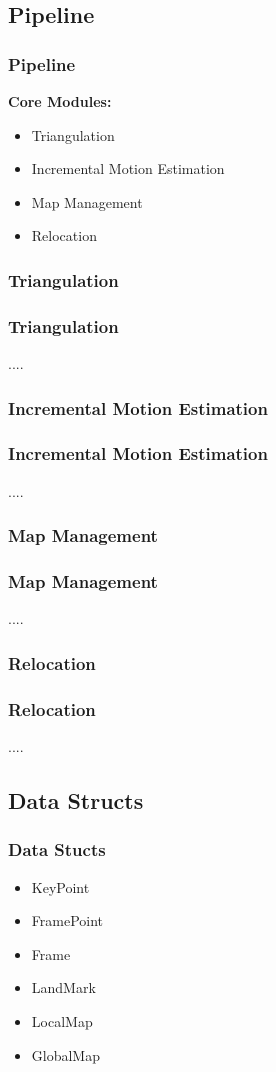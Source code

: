 \documentclass[16pt]{beamer}
\begin{document}
\subsection{Pipeline}
\begin{frame}
  \frametitle{Pipeline}
  \textbf{ Core Modules: } \\
  \begin{itemize}
  \item Triangulation
  \item Incremental Motion Estimation
  \item Map Management 
  \item Relocation
  \end{itemize}

\end{frame}

\subsubsection*{Triangulation}
\begin{frame}
  \frametitle{Triangulation}
  ....
\end{frame}

\subsubsection*{Incremental Motion Estimation}
\begin{frame}
  \frametitle{Incremental Motion Estimation}
  ....
\end{frame}


\subsubsection*{Map Management}
\begin{frame}
  \frametitle{Map Management}
  ....
\end{frame}


\subsubsection*{Relocation}
\begin{frame}
  \frametitle{Relocation}
  ....
\end{frame}


\subsection{Data Structs}
\begin{frame}
  \frametitle{Data Stucts }
  \begin{itemize}
  \item KeyPoint
  \item FramePoint
  \item Frame
  \item LandMark
  \item LocalMap
  \item GlobalMap
  \end{itemize}
\end{frame}
\end{document}
